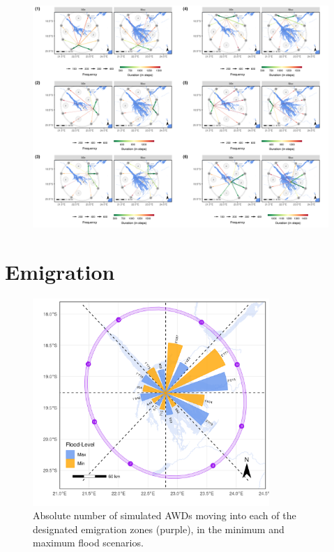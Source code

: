 \documentclass[abstract=on,10pt,a4paper,bibliography=totocnumbered]{article}
\begin{document}
\newpage
\begin{figure}[htbp]
  \begin{center}
  \includegraphics[width = \textwidth]{99_IPCBuffer.png}
  \caption{}
  \label{IPCBuffer}
  \end{center}
\end{figure}

\newpage
\section{Emigration}
\begin{figure}[htbp]
  \begin{center}
  \includegraphics[width = 0.8\textwidth]{99_Emigration.png}
  \caption{Absolute number of simulated AWDs moving into each of the designated
  emigration zones (purple), in the minimum and maximum flood scenarios.}
  \label{Emigration}
  \end{center}
\end{figure}

\newpage
\begingroup
\singlespacing

\endgroup
\end{document}
